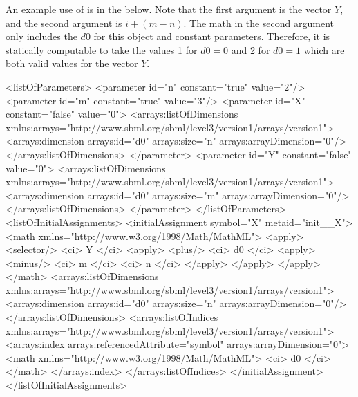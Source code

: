 An example use of  is in the \InitialAssignment below.   Note that the first argument is the vector $Y$, and the second argument is $i +  (m-n)$.   The math in the second argument only includes the \Dimension {}  $d0$ for this object and constant parameters.   Therefore, it is statically computable to take the values 1 for $d0=0$ and 2 for $d0=1$ which are both valid values for the vector $Y$.
\begin{example}[showstringspaces=false]
<listOfParameters>
    <parameter id="n" constant="true" value="2"/>
    <parameter id="m" constant="true" value="3"/>
    <parameter id="X" constant="false" value="0">
        <arrays:listOfDimensions
            xmlns:arrays="http://www.sbml.org/sbml/level3/version1/arrays/version1">
            <arrays:dimension arrays:id="d0" arrays:size="n" arrays:arrayDimension="0"/>
        </arrays:listOfDimensions>
    </parameter>
    <parameter id="Y" constant="false" value="0">
        <arrays:listOfDimensions
            xmlns:arrays="http://www.sbml.org/sbml/level3/version1/arrays/version1">
            <arrays:dimension arrays:id="d0" arrays:size="m" arrays:arrayDimension="0"/>
        </arrays:listOfDimensions>
    </parameter>
</listOfParameters>
<listOfInitialAssignments>
    <initialAssignment symbol="X" metaid="init__X">
        <math
            xmlns="http://www.w3.org/1998/Math/MathML">
            <apply>
                <selector/>
                <ci> Y </ci>
                <apply>
                    <plus/>
                    <ci> d0 </ci>
                    <apply>
                        <minus/>
                        <ci> m </ci>
                        <ci> n </ci>
                    </apply>
                </apply>
            </apply>
        </math>
        <arrays:listOfDimensions
            xmlns:arrays="http://www.sbml.org/sbml/level3/version1/arrays/version1">
            <arrays:dimension arrays:id="d0" arrays:size="n" arrays:arrayDimension="0"/>
        </arrays:listOfDimensions>
        <arrays:listOfIndices
            xmlns:arrays="http://www.sbml.org/sbml/level3/version1/arrays/version1">
            <arrays:index arrays:referencedAttribute="symbol" arrays:arrayDimension="0">
                <math
                    xmlns="http://www.w3.org/1998/Math/MathML">
                    <ci> d0 </ci>
                </math>
            </arrays:index>
        </arrays:listOfIndices>
    </initialAssignment>
</listOfInitialAssignments>
\end{example}


